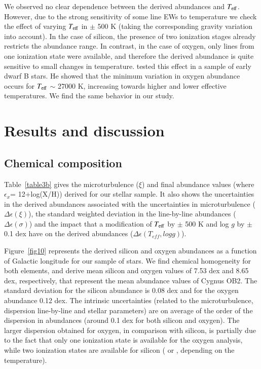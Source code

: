 \documentclass{aa} %
\begin{document}
We observed no clear dependence between the derived abundances and $T_{\rm eff}$. However, due to the strong sensitivity of some line EWs to temperature we check the effect of varying $T_{\rm eff}$ in $\pm$ 500 K (taking the corresponding gravity variation into account).  In the case of silicon, the presence of two ionization stages already restricts the abundance range. %
 In contrast, in the case of oxygen, only lines from one ionization state were available, and therefore the derived abundance is quite sensitive to small changes in temperature. \cite{ssimon10} tested this effect in a sample of early dwarf  B  stars. He showed that the minimum variation in oxygen abundance occurs for $T_{\rm eff}$ $\sim$ 27000 K, increasing towards higher and lower effective temperatures.  We find the same behavior in our study.



\section{Results and discussion}\label{sect4}


\subsection{Chemical composition}\label{sect41}

Table~\ref{table3b} gives the microturbulence ($\xi$) and final abundance values (where $\epsilon_{x}$= 12+log(X/H)) derived for our stellar sample. It also shows the uncertainties in the derived abundances associated with the uncertainties in microturbulence ($\Delta\epsilon(\xi)$), the standard weighted deviation in the line-by-line abundances ($\Delta\epsilon(\sigma)$) and the impact that a modification of $T_{\rm eff}$ by $\pm$ 500 K and log $g$ by $\pm$ 0.1 dex have on the derived abundances ($\Delta\epsilon(T_{eff},log g)$). 


Figure~\ref{fig10} represents the derived silicon and oxygen abundances as a function of Galactic longitude for our sample of stars.
We find chemical homogeneity for both elements, and derive mean silicon and oxygen values of 7.53 dex and 8.65 dex, respectively, that represent the mean abundance values of Cygnus OB2. The standard deviation for the silicon abundance is 0.08 dex and for the oxygen abundance 0.12 dex. The intrinsic uncertainties (related to the microturbulence, dispersion line-by-line and stellar parameters) are on average of the order of the dispersion in abundances (around 0.1 dex for both silicon and oxygen). 
The larger dispersion obtained for oxygen, in comparison with silicon, is partially due to 
the fact that only one ionization state is available for the oxygen analysis, while two ionization states are available for silicon ( or , depending on the temperature). 
\end{document}
